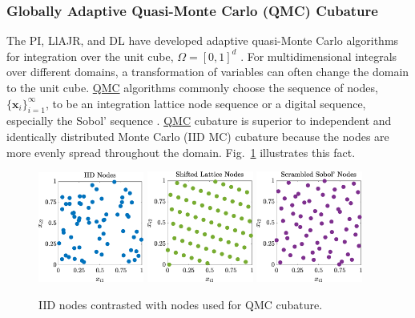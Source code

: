\documentclass[11pt]{NSFamsart}
\newcommand{\QMC}{\hyperlink{QMClink}{QMC}\xspace}
\newcommand{\bx}{{\boldsymbol{x}}}
\begin{document}
\subsubsection[QMCsec]{Globally  Adaptive Quasi-Monte Carlo (QMC) 
Cubature} \hypertarget{QMClink}{}
\label{QMCsec}
The PI, LlAJR, and DL 
have 
developed adaptive quasi-Monte Carlo algorithms for integration over the unit cube, $\Omega = 
[0,1]^d$ \cite{HicJim16a,JimHic16a}.  For multidimensional integrals over different domains, a 
transformation of variables can 
often change the domain to the unit cube.  \QMC algorithms  commonly 
choose the 
sequence of nodes, $\{\bx_i\}_{i=1}^\infty$, to be an integration lattice node sequence  or a digital 
sequence, especially the Sobol' sequence \cite{DicEtal14a}.  \QMC cubature is superior to 
independent and identically distributed Monte Carlo (\hypertarget{IIDMClink}{IID MC}) cubature 
because the nodes are more 
evenly spread throughout the domain.   Fig.\ \ref{PtsFig} illustrates this fact.

\begin{figure}[h] %
	\centering
	\includegraphics[width = 0.31\textwidth]{ProgramsImages/IIDPoints.eps} \quad
	\includegraphics[width = 0.31\textwidth]{ProgramsImages/ShiftedLatticePoints.eps}  \quad
	\includegraphics[width = 0.31\textwidth]{ProgramsImages/SSobolPoints.eps} 
	
	\caption{IID nodes contrasted with nodes used for QMC cubature.\label{PtsFig}}
\end{figure}
\end{document}
